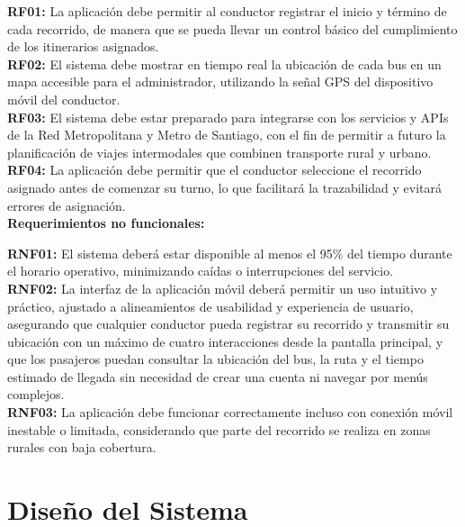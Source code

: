 \documentclass[12pt]{article}
\begin{document}
\textbf{RF01:} La aplicación debe permitir al conductor registrar el inicio y término de cada recorrido, de manera que se pueda llevar un control básico del cumplimiento de los itinerarios asignados.\\ 
\textbf{RF02:} El sistema debe mostrar en tiempo real la ubicación de cada bus en un mapa accesible para el administrador, utilizando la señal GPS del dispositivo móvil del conductor.\\
\textbf{RF03:} El sistema debe estar preparado para integrarse con los servicios y APIs de la Red Metropolitana y Metro de Santiago, con el fin de permitir a futuro la planificación de viajes intermodales que combinen transporte rural y urbano.\\
\textbf{RF04:} La aplicación debe permitir que el conductor seleccione el recorrido asignado antes de comenzar su turno, lo que facilitará la trazabilidad y evitará errores de asignación.\\

\textbf{Requerimientos no funcionales:}

\textbf{RNF01:} El sistema deberá estar disponible al menos el 95\% del tiempo durante el horario operativo, minimizando caídas o interrupciones del servicio.\\  
\textbf{RNF02:} La interfaz de la aplicación móvil deberá permitir un uso intuitivo y práctico, ajustado a alineamientos de usabilidad y experiencia de usuario, asegurando que cualquier conductor pueda registrar su recorrido y transmitir su ubicación con un máximo de cuatro interacciones desde la pantalla principal, y que los pasajeros puedan consultar la ubicación del bus, la ruta y el tiempo estimado de llegada sin necesidad de crear una cuenta ni navegar por menús complejos.\\  
\textbf{RNF03:} La aplicación debe funcionar correctamente incluso con conexión móvil inestable o limitada, considerando que parte del recorrido se realiza en zonas rurales con baja cobertura.\\

\section{Diseño del Sistema}
\end{document}
